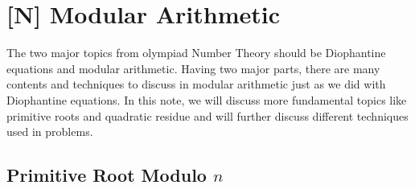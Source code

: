 \documentclass[../../../main.tex]{subfiles}
\begin{document}
\chapter{[N] Modular Arithmetic}

The two major topics from olympiad Number Theory should be
Diophantine equations and modular arithmetic. Having two major
parts, there are many contents and techniques to discuss in
modular arithmetic just as we did with Diophantine equations.
In this note, we will discuss more fundamental topics like
primitive roots and quadratic residue and will further discuss
different techniques used in problems.

\section{Primitive Root Modulo \texorpdfstring{$n$}{n}}
\end{document}
